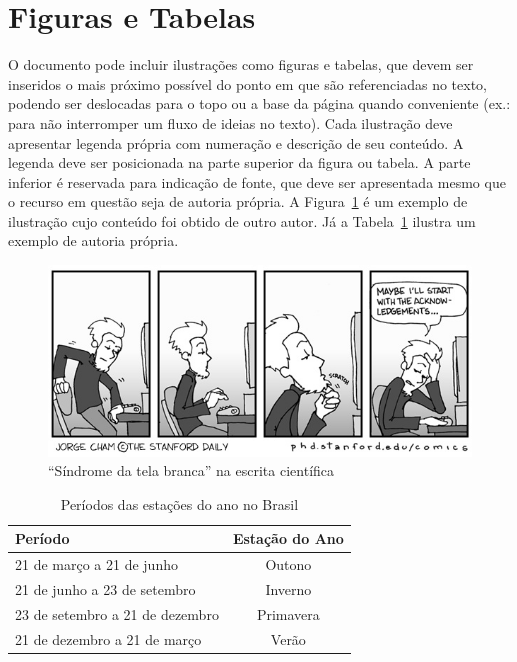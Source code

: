 \documentclass{ifsultcc}
\begin{document}
\section{Figuras e Tabelas}
O documento pode incluir ilustrações como figuras e tabelas, que devem ser inseridos o mais próximo possível do ponto em que são referenciadas no texto, podendo ser deslocadas para o topo ou a base da página quando conveniente (ex.: para não interromper um fluxo de ideias no texto).  Cada ilustração deve apresentar legenda própria com numeração e descrição de seu conteúdo.  A legenda deve ser posicionada na parte superior da figura ou tabela.  A parte inferior é reservada para indicação de fonte, que deve ser apresentada mesmo que o recurso em questão seja de autoria própria.  A Figura~\ref{fig:escrita} é um exemplo de ilustração cujo conteúdo foi obtido de outro autor.  Já a Tabela~\ref{tab:estacoes} ilustra um exemplo de autoria própria.  

\begin{figure}[ht]
	\caption{``Síndrome da tela branca'' na escrita científica}
	\label{fig:escrita}
	\begin{area}{10cm}
		\includegraphics{escrita.jpg}
	\end{area}
\end{figure}

\begin{table}[ht]
	\caption{Períodos das estações do ano no Brasil}
	\label{tab:estacoes}
	\begin{area}{10cm}
		\begin{tabularx}{\textwidth}{Xc}
			\hline
			\textbf{Período} & \textbf{Estação do Ano}\\
			\hline
			21 de março a 21 de junho & Outono\\
			21 de junho a 23 de setembro & Inverno\\
			23 de setembro a 21 de dezembro & Primavera\\
			21 de dezembro a 21 de março & Verão\\
			\hline
		\end{tabularx}
	\end{area}
\end{table}
\end{document}
